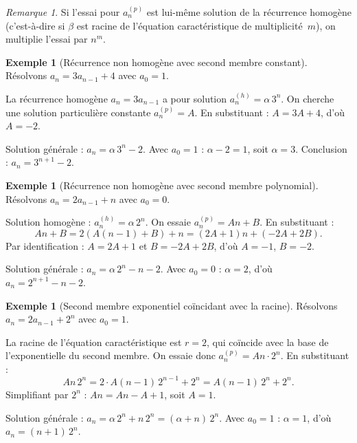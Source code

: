 \documentclass[12pt,a4paper,openany]{book}
\theoremstyle{definition}
\newtheorem{exemple}[definition]{Exemple}
\theoremstyle{plain}
\theoremstyle{remark}
\newtheorem{remarque}[definition]{Remarque}
\begin{document}
\begin{remarque}
Si l'essai pour $a_n^{(p)}$ est lui-même solution de la récurrence homogène
(c'est-à-dire si $\beta$ est racine de l'équation caractéristique de
multiplicité~$m$), on multiplie l'essai par $n^m$.
\end{remarque}

\begin{exemple}[Récurrence non homogène avec second membre constant]
\label{ex:non-hom-constante}
Résolvons $a_n = 3a_{n-1} + 4$ avec $a_0 = 1$.

La récurrence homogène $a_n = 3a_{n-1}$ a pour solution $a_n^{(h)} = \alpha\, 3^n$.
On cherche une solution particulière constante $a_n^{(p)} = A$.
En substituant : $A = 3A + 4$, d'où $A = -2$.

Solution générale : $a_n = \alpha\, 3^n - 2$. Avec $a_0 = 1$ :
$\alpha - 2 = 1$, soit $\alpha = 3$.
Conclusion : $a_n = 3^{n+1} - 2$.
\end{exemple}

\begin{exemple}[Récurrence non homogène avec second membre polynomial]
\label{ex:non-hom-poly}
Résolvons $a_n = 2a_{n-1} + n$ avec $a_0 = 0$.

Solution homogène : $a_n^{(h)} = \alpha\, 2^n$. On essaie
$a_n^{(p)} = An + B$. En substituant :
\[
  An + B = 2(A(n-1) + B) + n = (2A + 1)n + (-2A + 2B).
\]
Par identification : $A = 2A + 1$ et $B = -2A + 2B$, d'où $A = -1$, $B = -2$.

Solution générale : $a_n = \alpha\, 2^n - n - 2$. Avec $a_0 = 0$ :
$\alpha = 2$, d'où $a_n = 2^{n+1} - n - 2$.
\end{exemple}

\begin{exemple}[Second membre exponentiel coïncidant avec la racine]
\label{ex:non-hom-expo-racine}
Résolvons $a_n = 2a_{n-1} + 2^n$ avec $a_0 = 1$.

La racine de l'équation caractéristique est $r = 2$, qui coïncide avec la base
de l'exponentielle du second membre. On essaie donc $a_n^{(p)} = An \cdot 2^n$.
En substituant :
\[
  An\, 2^n = 2 \cdot A(n-1)\, 2^{n-1} + 2^n = A(n-1)\, 2^n + 2^n.
\]
Simplifiant par $2^n$ : $An = An - A + 1$, soit $A = 1$.

Solution générale : $a_n = \alpha\, 2^n + n\, 2^n = (\alpha + n)\, 2^n$.
Avec $a_0 = 1$ : $\alpha = 1$, d'où $a_n = (n+1)\, 2^n$.
\end{exemple}

\end{document}
